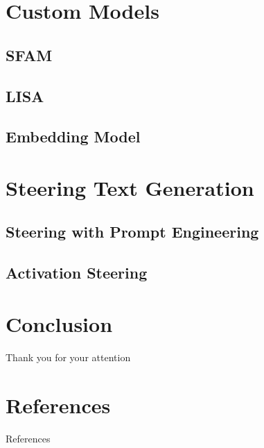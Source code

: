 \documentclass[t]{beamer}
\begin{document}
\section{Custom Models}
\subsection{SFAM}

\subsection{LISA}

\subsection{Embedding Model}


\section{Steering Text Generation}
\subsection{Steering with Prompt Engineering}

\subsection{Activation Steering}


\section{Conclusion}



\begin{frame}[c]
  \centering \Large
  Thank you for your attention
\end{frame}


\section*{References}
\begin{frame}[allowframebreaks]{References}
  \printbibliography
\end{frame}
\end{document}
